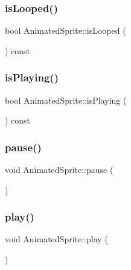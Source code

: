\hypertarget{class_animated_sprite_aaf2c2fb0e1487e689af4a6bbeb7e3e85}{}\label{class_animated_sprite_aaf2c2fb0e1487e689af4a6bbeb7e3e85} 
\subsubsection{\texorpdfstring{is\+Looped()}{isLooped()}}
{\footnotesize\ttfamily bool Animated\+Sprite\+::is\+Looped (\begin{DoxyParamCaption}{ }\end{DoxyParamCaption}) const}

\hypertarget{class_animated_sprite_a55f450add05d45e5369a6ad24f9e438f}{}\label{class_animated_sprite_a55f450add05d45e5369a6ad24f9e438f} 
\subsubsection{\texorpdfstring{is\+Playing()}{isPlaying()}}
{\footnotesize\ttfamily bool Animated\+Sprite\+::is\+Playing (\begin{DoxyParamCaption}{ }\end{DoxyParamCaption}) const}

\hypertarget{class_animated_sprite_a48384db59427423b5c1d98f6ee94fe45}{}\label{class_animated_sprite_a48384db59427423b5c1d98f6ee94fe45} 
\subsubsection{\texorpdfstring{pause()}{pause()}}
{\footnotesize\ttfamily void Animated\+Sprite\+::pause (\begin{DoxyParamCaption}{ }\end{DoxyParamCaption})}

\hypertarget{class_animated_sprite_a203b968f1cb374cca5dbc89716174020}{}\label{class_animated_sprite_a203b968f1cb374cca5dbc89716174020} 
\subsubsection{\texorpdfstring{play()}{play()}\hspace{0.1cm}{\footnotesize\ttfamily [1/2]}}
{\footnotesize\ttfamily void Animated\+Sprite\+::play (\begin{DoxyParamCaption}{ }\end{DoxyParamCaption})}

